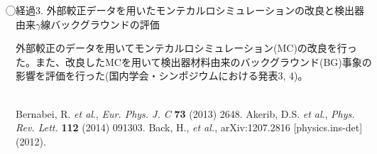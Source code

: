 \documentclass[10pt,a4paper,twoside]{jarticle}
\newcommand{\研究課題名}{XMASS検出器を用いた季節変動による暗黒物質の直接探索}
\newcommand{\研究機関名}{神戸大学}
\newcommand{\申請者氏名}{岡直哉}
\newcommand{\研究代表者氏名}{\申請者氏名}
\newcommand{\研究期間の最終元号年度}{29}	%
\begin{document}
{\textcircled{}経過3. 外部較正データを用いたモンテカルロシミュレーションの改良と検出器由来$\gamma$線バックグラウンドの評価\par
外部較正のデータを用いてモンテカルロシミュレーション(MC)の改良を行った。また、改良したMCを用いて検出器材料由来のバックグラウンド(BG)事象の影響を評価を行った(国内学会・シンポジウムにおける発表3, 4)。\\
　\par
\begin{thebibliography}{99}
\setlength{\itemsep}{-5pt}  %
	Bernabei, R. \textit{et al}., \textit{Eur. Phys. J. C} \textbf{73} (2013) 2648.
	Akerib, D.S. \textit{et al}.,  \textit{Phys. Rev. Lett.} \textbf{112} (2014) 091303.
	Back, H., \textit{et al.},  arXiv:1207.2816 [physics.ins-det] (2012).
\end{thebibliography}


}
\end{document}
